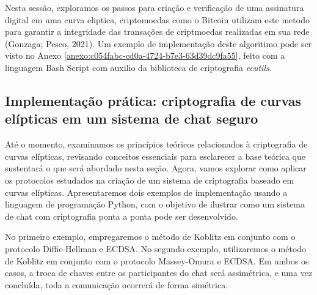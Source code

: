 Nesta sessão, exploramos os passos para criação e verificação de uma assinatura
digital em uma curva eliptica, criptomoedas como o Bitcoin utilizam este metodo
para garantir a integridade das transações de criptmoedas realizadas em sua
rede (Gonzaga; Pesco, 2021). Um exemplo de implementação deste algoritimo pode
ser visto no Anexo \ref{anexo:c054fabc-cd0a-4724-b7e3-63d39dc9fa55}, feito com
a linguagem Bash Script com auxilio da biblioteca de criptografia
\textit{ecutils}.

\subsection{Implementação prática: criptografia de curvas elípticas em um sistema de chat seguro} \label{subsec:63b4dc8f-d8da-4a7b-a88b-3e090a82c774}

Até o momento, examinamos os princípios teóricos relacionados à criptografia de
curvas elípticas, revisando conceitos essenciais para esclarecer a base teórica
que sustentará o que será abordado nesta seção. Agora, vamos explorar como
aplicar os protocolos estudados na criação de um sistema de criptografia
baseado em curvas elípticas. Apresentaremos dois exemplos de implementação
usando a linguagem de programação Python, com o objetivo de ilustrar como um
sistema de chat com criptografia ponta a ponta pode ser desenvolvido.

No primeiro exemplo, empregaremos o método de Koblitz em conjunto com o
protocolo Diffie-Hellman e ECDSA. No segundo exemplo, utilizaremos o método de
Koblitz em conjunto com o protocolo Massey-Omura e ECDSA. Em ambos os casos, a
troca de chaves entre os participantes do chat será assimétrica, e uma vez
concluída, toda a comunicação ocorrerá de forma simétrica.

